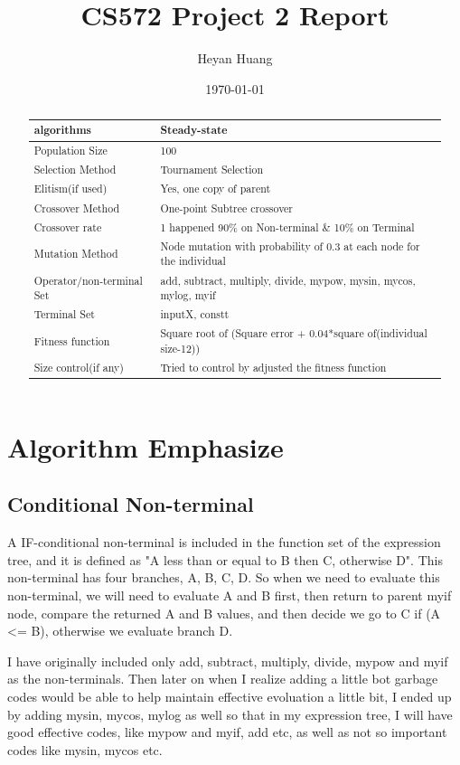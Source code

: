 \documentclass[10pt,b5paper]{article}
\author{Heyan Huang}
\date{\today}
\title{CS572 Project 2 Report}
\begin{document}
\maketitle
\tableofcontents

\begin{abstract}
\begin{center}
\begin{tabular}{ll}
\hline
algorithms & Steady-state\\
\hline
Population Size & 100\\
Selection Method & Tournament Selection\\
Elitism(if used) & Yes, one copy of parent\\
Crossover Method & One-point Subtree crossover\\
Crossover rate & 1 happened 90\% on Non-terminal \& 10\% on Terminal\\
Mutation Method & Node mutation with probability of 0.3 at each node for the individual\\
Operator/non-terminal Set & add, subtract, multiply, divide, mypow, mysin, mycos, mylog, myif\\
Terminal Set & inputX, constt\\
Fitness function & Square root of (Square error + 0.04*square of(individual size-12))\\
Size control(if any) & Tried to control by adjusted the fitness function\\
\hline
\end{tabular}
\end{center}
\end{abstract}

\section{Algorithm Emphasize}
\label{sec-1}
\subsection{Conditional Non-terminal}
\label{sec-1-1}
A IF-conditional non-terminal is included in the function set of the expression tree, and it is defined as "A less than or equal to B then C, otherwise D". This non-terminal has four branches, A, B, C, D. So when we need to evaluate this non-terminal, we will need to evaluate A and B first, then return to parent myif node, compare the returned A and B values, and then decide we go to C if (A <= B), otherwise we evaluate branch D.

I have originally included only add, subtract, multiply, divide, mypow and myif as the non-terminals. Then later on when I realize adding a little bot garbage codes would be able to help maintain effective evoluation a little bit, I ended up by adding mysin, mycos, mylog as well so that in my expression tree, I will have good effective codes, like mypow and myif, add etc, as well as not so important codes like mysin, mycos etc.
\end{document}
